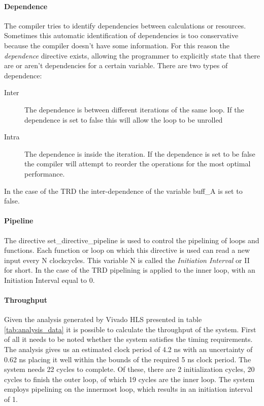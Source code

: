 \paragraph{Dependence} The compiler tries to identify dependencies between calculations or resources. Sometimes this automatic identification of dependencies is too conservative because the compiler doesn't have some information. For this reason the \emph{dependence} directive exists, allowing the programmer to explicitly state that there are or aren't dependencies for a certain variable. There are two types of dependence:

\begin{description}
\item[Inter] The dependence is between different iterations of the same loop. If the dependence is set to false this will allow the loop to be unrolled
\item[Intra] The dependence is inside the iteration. If the dependence is set to be false the compiler will attempt to reorder the operations for the most optimal performance.
\end{description}

In the case of the TRD the inter-dependence of the variable buff\_A is set to false.

\paragraph{Pipeline} The directive set\_directive\_pipeline is used to control the pipelining of loops and functions. Each function or loop on which this directive is used can read a new input every N clockcycles. This variable N is called the \emph{Initiation Interval} or II for short. In the case of the TRD pipelining is applied to the inner loop, with an Initiation Interval equal to 0.


\paragraph{Throughput}
\label{sec:original_througput}

Given the analysis generated by Vivado HLS presented in table \ref{tab:analysis_data} it is possible to calculate the throughput of the system. First of all it needs to be noted whether the system satisfies the timing requirements. The analysis gives us an estimated clock period of 4.2 ns with an uncertainty of 0.62 ns placing it well within the bounds of the required 5 ns clock period.
The system needs 22 cycles to complete. Of these, there are 2 initialization cycles, 20 cycles to finish the outer loop, of which 19 cycles are the inner loop. The system employs pipelining on the innermost loop, which results in an initiation interval of 1.

